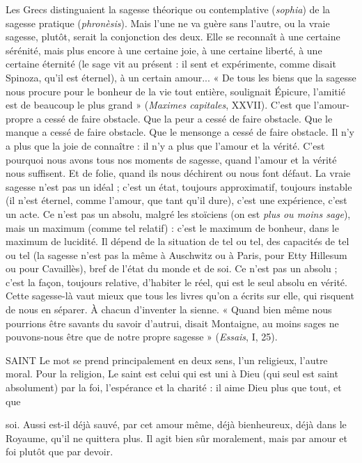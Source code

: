 Les Grecs distinguaient la sagesse théorique ou contemplative ({\it sophia}) de la
sagesse pratique ({\it phronèsis}). Mais l’une ne va guère sans l’autre, ou la vraie
sagesse, plutôt, serait la conjonction des deux. Elle se reconnaît à une certaine
sérénité, mais plus encore à une certaine joie, à une certaine liberté, à une certaine
éternité (le sage vit au présent : il sent et expérimente, comme disait Spinoza,
qu'il est éternel), à un certain amour... « De tous les biens que la sagesse
nous procure pour le bonheur de la vie tout entière, soulignait Épicure, l'amitié
est de beaucoup le plus grand » ({\it Maximes capitales}, XXVII). C’est que l'amour-propre
a cessé de faire obstacle. Que la peur a cessé de faire obstacle. Que le
manque a cessé de faire obstacle. Que le mensonge a cessé de faire obstacle. Il
n’y a plus que la joie de connaître : il n’y a plus que l'amour et la vérité. C’est
pourquoi nous avons tous nos moments de sagesse, quand l’amour et la vérité
nous suffisent. Et de folie, quand ils nous déchirent ou nous font défaut. La
vraie sagesse n’est pas un idéal ; c’est un état, toujours approximatif, toujours
instable (il n’est éternel, comme l'amour, que tant qu’il dure), c’est une expérience,
c’est un acte. Ce n’est pas un absolu, malgré les stoïciens (on est {\it plus ou
moins sage}), mais un maximum (comme tel relatif) : c’est le maximum de bonheur,
dans le maximum de lucidité. Il dépend de la situation de tel ou tel, des
capacités de tel ou tel (la sagesse n’est pas la même à Auschwitz ou à Paris, pour
Etty Hillesum ou pour Cavaillès), bref de l’état du monde et de soi. Ce n’est
pas un absolu ; c’est la façon, toujours relative, d’habiter le réel, qui est le seul
absolu en vérité. Cette sagesse-là vaut mieux que tous les livres qu’on a écrits
sur elle, qui risquent de nous en séparer. À chacun d'inventer la sienne.
« Quand bien même nous pourrions être savants du savoir d’autrui, disait
Montaigne, au moins sages ne pouvons-nous être que de notre propre sagesse »
({\it Essais}, I, 25).

SAINT Le mot se prend principalement en deux sens, l’un religieux, l'autre
moral.
Pour la religion, Le saint est celui qui est uni à Dieu (qui seul est saint absolument)
par la foi, l’espérance et la charité : il aime Dieu plus que tout, et que

soi. Aussi est-il déjà sauvé, par cet amour même, déjà bienheureux, déjà dans le
Royaume, qu'il ne quittera plus. Il agit bien sûr moralement, mais par amour
et foi plutôt que par devoir.


